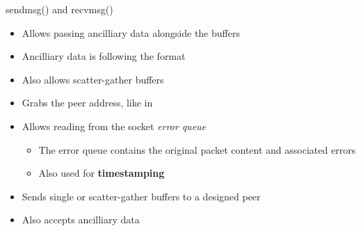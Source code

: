 \begin{frame}{sendmsg() and recvmsg()}
	\begin{itemize}
		\item Allows passing ancilliary data alongside the buffers
		\item Ancilliary data is following the  format
		\item Also allows scatter-gather buffers
	\end{itemize}
	\begin{itemize}
		\item Grabs the peer address, like in 
		\item Allows reading from the socket \textit{error queue}
			\begin{itemize}
				\item The error queue contains the original packet content and associated errors
				\item Also used for \textbf{timestamping}
			\end{itemize}
	\end{itemize}
	\vspace{0.5cm}
	\begin{itemize}
		\item Sends single or scatter-gather buffers to a designed peer
		\item Also accepts ancilliary data
	\end{itemize}

\end{frame}

